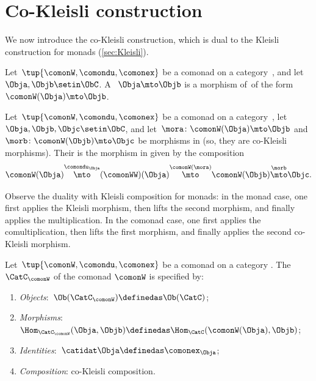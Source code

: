 
\section{Co-Kleisli construction}
\label{sec:cokleisli}



We now introduce the co-Kleisli construction, which is dual to the Kleisli construction for monads (\cref{sec:Kleisli}).


\begin{ctdefinition}
    \label{def:cokleisli-morphism}
    Let~$\tup{\comonW, \comondu, \comonex}$ be a comonad on a category~\CatC, and let~$\Obja, \Objb \setin \ObC$.
    A ~$\Obja \mto \Objb$ is a morphism of~\CatC of the form~$\comonW(\Obja) \mto \Objb$.
\end{ctdefinition}


\begin{ctdefinition}
    \label{def:cokleisli-composition}
    Let~$\tup{\comonW, \comondu, \comonex}$ be a comonad on a category~\CatC, let~$\Obja, \Objb, \Objc \setin \ObC$, and let~$\mora \colon \comonW(\Obja) \mto \Objb$ and $\morb \colon \comonW(\Objb) \mto \Objc$ be morphisms in \CatC (so, they are co-Kleisli morphisms).
    Their  is the morphism in \CatC given by the composition
    \begin{equation}
        \comonW(\Obja) \overset{\comondu_\Obja}{\mto} (\comonWW)(\Obja) \overset{\comonW(\mora)}{\mto} \comonW(\Objb) \overset{\morb}{\mto} \Objc.
    \end{equation}
\end{ctdefinition}

Observe the duality with Kleisli composition for monads: in the monad case, one first applies the Kleisli morphism, then lifts the second morphism, and finally applies the multiplication. In the comonad case, one first applies the comultiplication, then lifts the first morphism, and finally applies the second co-Kleisli morphism.


\begin{ctdefinition}
    \label{def:cokleisli-category}
    Let~$\tup{\comonW, \comondu, \comonex}$ be a comonad on a category \CatC.
    The  $\CatC_\comonW$ of the comonad $\comonW$ is specified by:
    \begin{enumerate}
        \item \emph{Objects}:~$\Ob(\CatC_\comonW) \definedas \Ob(\CatC)$;
        \item \emph{Morphisms}:~$\Hom_{\CatC_\comonW}(\Obja, \Objb) \definedas \Hom_{\CatC}(\comonW(\Obja), \Objb)$;
        \item \emph{Identities}:~$\catidat\Obja \definedas \comonex_\Obja$;
        \item \emph{Composition}: co-Kleisli composition.
    \end{enumerate}
\end{ctdefinition}

